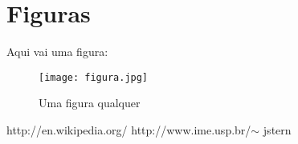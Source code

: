 \documentclass[12pt,a4paper]{report} %
\begin{document}
\section{Figuras}
\mbox{}

Aqui vai uma figura:

\begin{figure}[h!t] %
\centering %
\texttt{[image: figura.jpg]} %
\caption{Uma figura qualquer} %
\label{figurinha} %
\end{figure}

\cleardoublepage %

\begin{thebibliography}{99} %
http://en.wikipedia.org/ %
http://www.ime.usp.br/$\sim$ jstern

\end{thebibliography}
\end{document}
